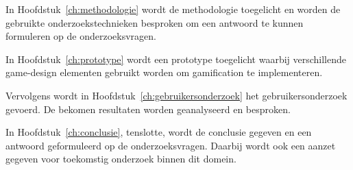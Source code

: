 In Hoofdstuk~\ref{ch:methodologie} wordt de methodologie toegelicht en worden de gebruikte onderzoekstechnieken besproken om een antwoord te kunnen formuleren op de onderzoeksvragen.

In Hoofdstuk~\ref{ch:prototype} wordt een prototype toegelicht waarbij verschillende game-design elementen gebruikt worden om gamification te implementeren.

Vervolgens wordt in Hoofdstuk~\ref{ch:gebruikersonderzoek} het gebruikersonderzoek gevoerd. De bekomen resultaten worden geanalyseerd en besproken.

In Hoofdstuk~\ref{ch:conclusie}, tenslotte, wordt de conclusie gegeven en een antwoord geformuleerd op de onderzoeksvragen. Daarbij wordt ook een aanzet gegeven voor toekomstig onderzoek binnen dit domein.